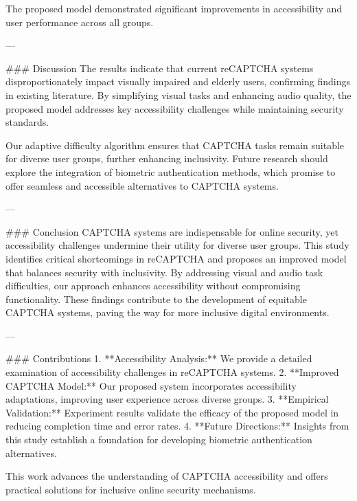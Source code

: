 The proposed model demonstrated significant improvements in accessibility and user performance across all groups.

---

### Discussion  
The results indicate that current reCAPTCHA systems disproportionately impact visually impaired and elderly users, confirming findings in existing literature. By simplifying visual tasks and enhancing audio quality, the proposed model addresses key accessibility challenges while maintaining security standards.

Our adaptive difficulty algorithm ensures that CAPTCHA tasks remain suitable for diverse user groups, further enhancing inclusivity. Future research should explore the integration of biometric authentication methods, which promise to offer seamless and accessible alternatives to CAPTCHA systems.

---

### Conclusion  
CAPTCHA systems are indispensable for online security, yet accessibility challenges undermine their utility for diverse user groups. This study identifies critical shortcomings in reCAPTCHA and proposes an improved model that balances security with inclusivity. By addressing visual and audio task difficulties, our approach enhances accessibility without compromising functionality. These findings contribute to the development of equitable CAPTCHA systems, paving the way for more inclusive digital environments.

---

### Contributions  
1. **Accessibility Analysis:** We provide a detailed examination of accessibility challenges in reCAPTCHA systems.  
2. **Improved CAPTCHA Model:** Our proposed system incorporates accessibility adaptations, improving user experience across diverse groups.  
3. **Empirical Validation:** Experiment results validate the efficacy of the proposed model in reducing completion time and error rates.  
4. **Future Directions:** Insights from this study establish a foundation for developing biometric authentication alternatives.

This work advances the understanding of CAPTCHA accessibility and offers practical solutions for inclusive online security mechanisms.